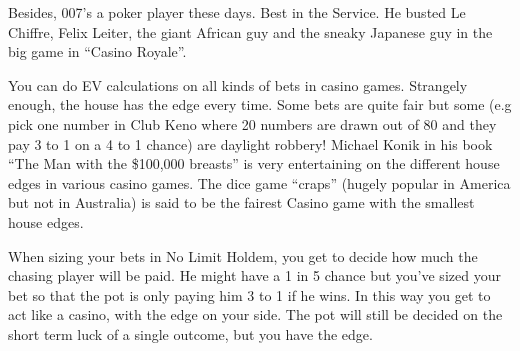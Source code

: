 Besides, 007's a poker player these days. Best in the Service.
He busted Le Chiffre, Felix Leiter, the giant African guy and
the sneaky Japanese guy in the big game in ``Casino Royale''.

You can do EV calculations on all kinds of bets in casino games.
Strangely enough, the house has the edge every time. Some bets
are quite fair but some (e.g pick one number in Club Keno
where 20 numbers are drawn out of 80 and they pay
3 to 1 on a 4 to 1 chance) are daylight robbery! Michael Konik
in his book ``The Man with the \$100,000 breasts'' is very entertaining on the
different house edges in various casino games. The dice game ``craps''
(hugely popular in America but not in Australia) is said to be
the fairest Casino game with the smallest house edges.

When sizing your bets in No Limit Holdem, you get to decide how much
the chasing player will be paid. He might have a 1 in 5 chance
but you've sized your bet so that the pot is only paying him 3 to 1
if he wins. In this way you get to act like a casino, with the edge
on your side. The pot will still be decided on the short term luck
of a single outcome, but you have the edge.

